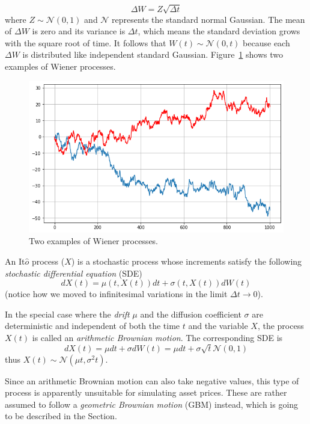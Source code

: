 \begin{equation}
\Delta W = Z\sqrt{\Delta t}
\end{equation}
where $Z ∼ \mathcal{N}(0, 1)$ and $\mathcal{N}$ represents the standard normal Gaussian. 
The mean of $\Delta W$ is zero and its variance is $\Delta t$, which means the standard deviation grows with the square root of time. It follows that $W(t) ∼ \mathcal{N}(0, t)$ because each $\Delta W$ is distributed like independent standard Gaussian. Figure~\ref{fig:wiener_process} shows two examples of Wiener processes.

\begin{figure}[htb]
	\centering
	\includegraphics[width=0.7\linewidth]{figures/wiener_process.png}
	\caption{Two examples of Wiener processes.}
	\label{fig:wiener_process}
\end{figure}

An It$\hat{o}$ process ($X$) is a stochastic process whose increments satisfy the following \emph{stochastic differential equation} (SDE) 
\begin{equation}
dX(t) = \mu(t, X(t)) dt + \sigma(t, X(t)) dW(t)
\end{equation}
(notice how we moved to infinitesimal variations in the limit $\Delta t\rightarrow 0$).

In the special case where the \emph{drift} $\mu$ and the diffusion coefficient $\sigma$ are deterministic and independent of both the time $t$ and the variable $X$, the process $X(t)$ is called an \emph{arithmetic Brownian motion}. The corresponding SDE is
\begin{equation}
dX(t) = \mu dt + \sigma dW(t) = \mu dt + \sigma \sqrt{t} \mathcal{N}(0,1) 
\end{equation}
thus $X(t) ∼ \mathcal{N}(\mu t, \sigma^2 t)$.

Since an arithmetic Brownian motion can also take negative values, this type of process is apparently unsuitable for simulating asset prices. These are rather assumed to follow a \emph{geometric Brownian motion} (GBM) instead, which is going to be described in the Section. 


